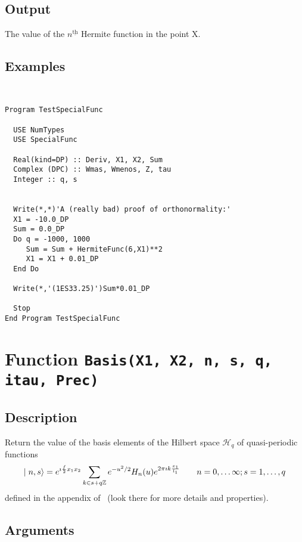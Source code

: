 \subsection{Output}

The value of the $n^{\underline{\text{th}}}$ Hermite function in
the point X.

\subsection{Examples}

\begin{verbatim}


Program TestSpecialFunc

  USE NumTypes
  USE SpecialFunc

  Real(kind=DP) :: Deriv, X1, X2, Sum
  Complex (DPC) :: Wmas, Wmenos, Z, tau
  Integer :: q, s


  Write(*,*)'A (really bad) proof of orthonormality:'
  X1 = -10.0_DP
  Sum = 0.0_DP
  Do q = -1000, 1000
     Sum = Sum + HermiteFunc(6,X1)**2
     X1 = X1 + 0.01_DP
  End Do

  Write(*,'(1ES33.25)')Sum*0.01_DP

  Stop
End Program TestSpecialFunc
\end{verbatim}

\section{Function \texttt{Basis(X1, X2, n, s, q, itau, Prec) }}

\subsection{Description}

Return the value of the basis elements of the Hilbert space $\mathcal
H_q$ of quasi-periodic functions
\begin{equation}
  \mid n,s \rangle = e^{\imath
    \frac{f}{2}x_1x_2} \sum_{k\in s + q\mathbb Z} 
  e^{-u^2/2}H_n(u)
  e^{2\pi\imath k\frac{x_1}{l_1}}\qquad n=0,\dots\infty;s=1,\dots,q
\end{equation}
defined in the appendix of~\cite{Gonzalez-Arroyo:2004xu} (look there
for more details and properties).

\subsection{Arguments}

